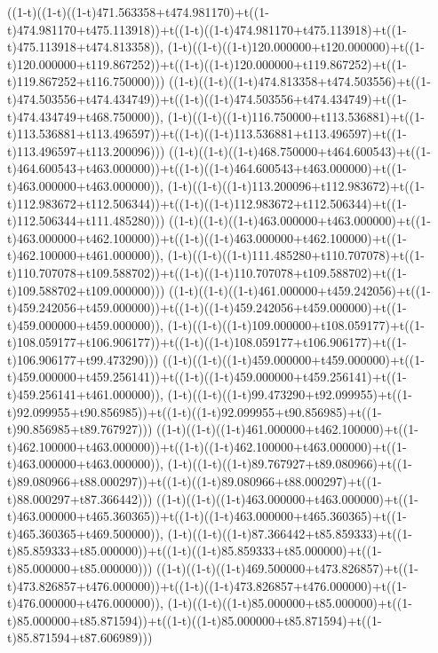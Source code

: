 ((1-t)((1-t)((1-t)471.563358+t474.981170)+t((1-t)474.981170+t475.113918))+t((1-t)((1-t)474.981170+t475.113918)+t((1-t)475.113918+t474.813358)),                                     (1-t)((1-t)((1-t)120.000000+t120.000000)+t((1-t)120.000000+t119.867252))+t((1-t)((1-t)120.000000+t119.867252)+t((1-t)119.867252+t116.750000)))
((1-t)((1-t)((1-t)474.813358+t474.503556)+t((1-t)474.503556+t474.434749))+t((1-t)((1-t)474.503556+t474.434749)+t((1-t)474.434749+t468.750000)),                                     (1-t)((1-t)((1-t)116.750000+t113.536881)+t((1-t)113.536881+t113.496597))+t((1-t)((1-t)113.536881+t113.496597)+t((1-t)113.496597+t113.200096)))
((1-t)((1-t)((1-t)468.750000+t464.600543)+t((1-t)464.600543+t463.000000))+t((1-t)((1-t)464.600543+t463.000000)+t((1-t)463.000000+t463.000000)),                                     (1-t)((1-t)((1-t)113.200096+t112.983672)+t((1-t)112.983672+t112.506344))+t((1-t)((1-t)112.983672+t112.506344)+t((1-t)112.506344+t111.485280)))
((1-t)((1-t)((1-t)463.000000+t463.000000)+t((1-t)463.000000+t462.100000))+t((1-t)((1-t)463.000000+t462.100000)+t((1-t)462.100000+t461.000000)),                                     (1-t)((1-t)((1-t)111.485280+t110.707078)+t((1-t)110.707078+t109.588702))+t((1-t)((1-t)110.707078+t109.588702)+t((1-t)109.588702+t109.000000)))
((1-t)((1-t)((1-t)461.000000+t459.242056)+t((1-t)459.242056+t459.000000))+t((1-t)((1-t)459.242056+t459.000000)+t((1-t)459.000000+t459.000000)),                                     (1-t)((1-t)((1-t)109.000000+t108.059177)+t((1-t)108.059177+t106.906177))+t((1-t)((1-t)108.059177+t106.906177)+t((1-t)106.906177+t99.473290)))
((1-t)((1-t)((1-t)459.000000+t459.000000)+t((1-t)459.000000+t459.256141))+t((1-t)((1-t)459.000000+t459.256141)+t((1-t)459.256141+t461.000000)),                                     (1-t)((1-t)((1-t)99.473290+t92.099955)+t((1-t)92.099955+t90.856985))+t((1-t)((1-t)92.099955+t90.856985)+t((1-t)90.856985+t89.767927)))
((1-t)((1-t)((1-t)461.000000+t462.100000)+t((1-t)462.100000+t463.000000))+t((1-t)((1-t)462.100000+t463.000000)+t((1-t)463.000000+t463.000000)),                                     (1-t)((1-t)((1-t)89.767927+t89.080966)+t((1-t)89.080966+t88.000297))+t((1-t)((1-t)89.080966+t88.000297)+t((1-t)88.000297+t87.366442)))
((1-t)((1-t)((1-t)463.000000+t463.000000)+t((1-t)463.000000+t465.360365))+t((1-t)((1-t)463.000000+t465.360365)+t((1-t)465.360365+t469.500000)),                                     (1-t)((1-t)((1-t)87.366442+t85.859333)+t((1-t)85.859333+t85.000000))+t((1-t)((1-t)85.859333+t85.000000)+t((1-t)85.000000+t85.000000)))
((1-t)((1-t)((1-t)469.500000+t473.826857)+t((1-t)473.826857+t476.000000))+t((1-t)((1-t)473.826857+t476.000000)+t((1-t)476.000000+t476.000000)),                                     (1-t)((1-t)((1-t)85.000000+t85.000000)+t((1-t)85.000000+t85.871594))+t((1-t)((1-t)85.000000+t85.871594)+t((1-t)85.871594+t87.606989)))
